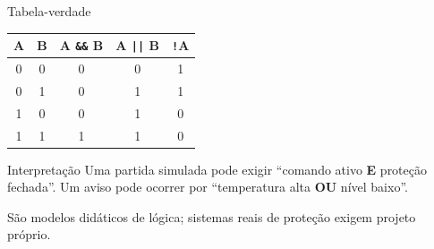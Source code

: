 \begin{frame}{Tabela-verdade}
\begin{center}
\begin{tabular}{ccccc}
\toprule
A & B & A \texttt{\&\&} B & A \texttt{||} B & \texttt{!}A \\
\midrule
0 & 0 & 0 & 0 & 1 \\
0 & 1 & 0 & 1 & 1 \\
1 & 0 & 0 & 1 & 0 \\
1 & 1 & 1 & 1 & 0 \\
\bottomrule
\end{tabular}
\end{center}
\begin{block}{Interpretação}
Uma partida simulada pode exigir ``comando ativo \textbf{E} proteção fechada''. Um aviso pode ocorrer por ``temperatura alta \textbf{OU} nível baixo''.
\end{block}
\small São modelos didáticos de lógica; sistemas reais de proteção exigem projeto próprio.
\end{frame}
